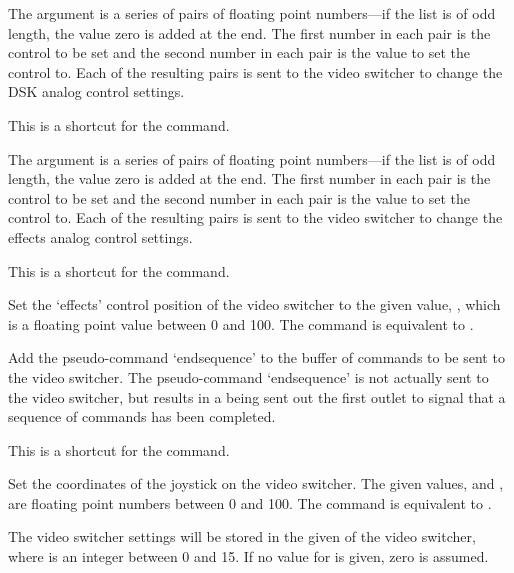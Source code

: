   The argument  is a series of pairs of floating point numbers---if the
  list is of odd length, the value zero is added at the end.
  The first number in each pair is the control to be set and the second number in each pair is the
  value to set the control to.
  Each of the resulting pairs is sent to the video switcher to change the DSK analog control settings.

  This is a shortcut for the  command.

  The argument  is a series of pairs of floating point numbers---if the
  list is of odd length, the value zero is added at the end.
  The first number in each pair is the control to be set and the second number in each pair is the
  value to set the control to.
  Each of the resulting pairs is sent to the video switcher to change the effects analog control
  settings.

  This is a shortcut for the  command.

  Set the `effects' control position of the video switcher to the given value, ,
  which is a floating point value between 0 and 100.
  The command is equivalent to .

  Add the pseudo-command `endsequence' to the buffer of commands to be sent to the video switcher.
  The pseudo-command `endsequence' is not actually sent to the video switcher, but results in a
   being sent out the first outlet to signal that a sequence of commands has been
  completed.

  This is a shortcut for the  command.

  Set the coordinates of the joystick on the video switcher.
  The given values,  and , are floating point numbers
  between 0 and 100.
  The command is equivalent to .

  The video switcher settings will be stored in the given  of the video switcher,
  where  is an integer between 0 and 15.
  If no value for  is given, zero is assumed.

